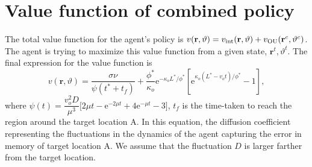 \documentclass[12pt]{article}
\def\e{\text{e}}
\def\r{\mathbf{r}}
\def\th{\hat{\mathbf{t}}}
\def\theta{\vartheta}
\begin{document}
\section{Value function of combined policy}
The total value function for the agent's policy is $v(\r, \theta) = v_{\rm int}(\r, \theta) + v_{\rm OU}(\r^c, \theta^c)$.
The agent is trying to maximize this value function from a given state, $\r^t, \theta^t$. The final expression
for the value function is
\[
    v(\r, \theta) = \frac{\sigma \nu}{\psi(t^*+t_f)} + \frac{\phi^*}{\kappa_o} \e^{-\kappa_o L^*/\phi^*} [ \e^{\kappa_o(L^*-v_ot)/\phi^*} - 1],
\]
where $\psi(t) = \dfrac{v_o^2 D}{\mu^3} \bigg[ 2 \mu t - \e^{-2 \mu t} + 4 \e^{-\mu t} - 3 \bigg]$, $t_f$ is the time-taken to reach
the region around the target location A. In this equation, the diffusion coefficient
representing the fluctuations in the dynamics of the agent capturing the error in memory
of target location A. We assume that the fluctuation $D$ is larger farther from the target location.


\end{document}
